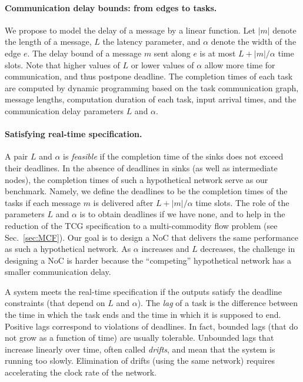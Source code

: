 \documentclass[a4paper,12pt]{article}
\newenvironment{proof sketch}[1]{\noindent {\emph{Proof sketch of #1:}}}{\hfill \qed}
\begin{document}
\paragraph{Communication delay bounds: from edges to tasks.}  We propose to model the
delay of a message by a linear function. Let $|m|$ denote the length of a message,
$L$ the latency parameter, and $\alpha$ denote the width of the edge $e$.  The delay
bound of a message $m$ sent along $e$ is at most $L+|m|/\alpha$ time slots.  Note
that higher values of $L$ or lower values of $\alpha$ allow more time for
communication, and thus postpone deadline.  The completion times of each task are
computed by dynamic programming based on the task communication graph, message
lengths, computation duration of each task, input arrival times, and the
communication delay parameters $L$ and $\alpha$.

\paragraph{Satisfying real-time specification.}  A pair $L$ and $\alpha$ is 
\emph{feasible} if the completion time of the sinks does not exceed their
deadlines. In the absence of deadlines in sinks (as well as intermediate nodes), the
completion times of such a hypothetical network serve as our benchmark.  Namely, we
define the deadlines to be the completion times of the tasks if each message $m$ is
delivered after $L+|m|/\alpha$ time slots. The role of the parameters $L$ and
$\alpha$ is to obtain deadlines if we have none, and to help in the reduction of the
TCG specification to a multi-commodity flow problem (see Sec.~\ref{sec:MCF}).  Our goal
is to design a NoC that delivers the same performance as such a hypothetical network.
As $\alpha$ increases and $L$ decreases, the challenge in designing a NoC is harder
because the ``competing'' hypothetical network has a smaller communication delay.

A system meets the real-time specification if the outputs satisfy the deadline
constraints (that depend on $L$ and $\alpha$).  The \emph{lag} of a task is the
difference between the time in which the task ends and the time in which it is
supposed to end.  Positive lags correspond to violations of deadlines. In fact,
bounded lags (that do not grow as a function of time) are usually tolerable.
Unbounded lags that increase linearly over time, often called \emph{drifts}, and mean
that the system is running too slowly. Elimination of drifts (using the same network)
requires accelerating the clock rate of the network.
\end{document}
